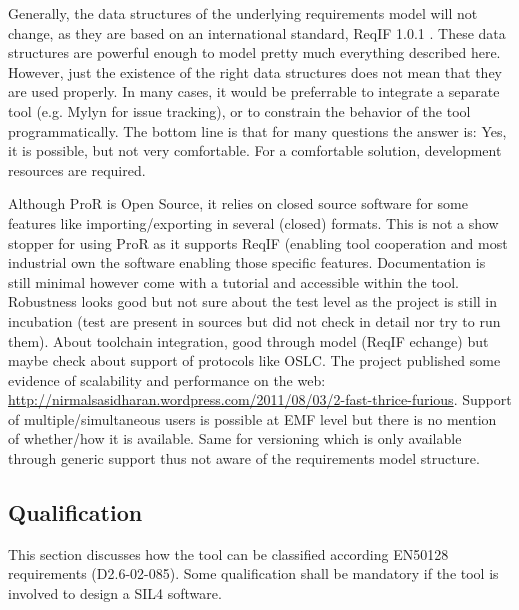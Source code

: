 \begin{author_comment}
Generally, the data structures of the underlying requirements model will not change, as they are based on an international standard, ReqIF 1.0.1 \cite{omg_requirements_2011}.  These data structures are powerful enough to model pretty much everything described here.  However, just the existence of the right data structures does not mean that they are used properly.  In many cases, it would be preferrable to integrate a separate tool (e.g. Mylyn for issue tracking), or to constrain the behavior of the tool programmatically.  The bottom line is that for many questions the answer is: Yes, it is possible, but not very comfortable.  For a comfortable solution, development resources are required.
\end{author_comment}

\begin{assessor2}
Although ProR is Open Source, it relies on closed source software for some features like importing/exporting in several (closed) formats. This is not a show stopper for using ProR as it supports ReqIF (enabling tool cooperation and most industrial own the software enabling those specific features. Documentation is still minimal however come with a tutorial and accessible within the tool. Robustness looks good but not sure about the test level as the project is still in incubation (test are present in sources but did not check in detail nor try to run them). About toolchain integration, good through model (ReqIF echange) but maybe check about support of protocols like OSLC. The project published some evidence of scalability and performance on the web: \url{http://nirmalsasidharan.wordpress.com/2011/08/03/2-fast-thrice-furious}. Support of multiple/simultaneous users is possible at EMF level but there is no mention of whether/how it is available. Same for versioning which is only available through generic support thus not aware of the requirements model structure.
\end{assessor2}

\subsection{Qualification}

This section discusses how the tool can be classified according EN50128 requirements (D2.6-02-085). Some qualification shall be mandatory  if the tool is involved to design a SIL4 software.



